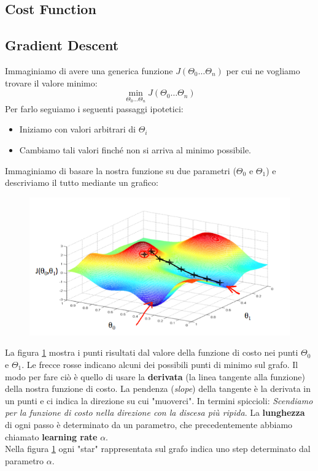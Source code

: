 \subsection{Cost Function}

\subsection{Gradient Descent}
Immaginiamo di avere una generica funzione $J(\Theta_0 \dots \Theta_n)$ per cui ne vogliamo trovare il valore minimo:
\[\min_{\Theta_0 \dots \Theta_n} J(\Theta_0 \dots \Theta_n)\]
Per farlo seguiamo i seguenti passaggi ipotetici:
\begin{itemize}
    \item Iniziamo con valori arbitrari di $\Theta_i$
    \item Cambiamo tali valori finché non si arriva al minimo possibile.
\end{itemize}
Immaginiamo di basare la nostra funzione su due parametri ($\Theta_0$ e $\Theta_1$) e descriviamo il tutto mediante un grafico:
\begin{figure}[h!]
    \centering
    \includegraphics[width=1\textwidth]{img/bn9SyaDIEeav5QpTGIv-Pg_0d06dca3d225f3de8b5a4a7e92254153_Screenshot-2016-11-01-23.48.26.png}
    \caption{}\label{GradientDescent1}
\end{figure}
La figura \ref{GradientDescent1} mostra i punti risultati dal valore della funzione di costo nei punti $\Theta_0$ e $\Theta_1$. Le frecce rosse indicano alcuni dei possibili punti di minimo sul grafo. Il modo per fare ciò è quello di usare la \textbf{derivata} (la linea tangente alla funzione) della nostra funzione di costo. La pendenza (\textit{slope}) della tangente è la derivata in un punti e ci indica la direzione su cui "muoverci". In termini spiccioli: \textit{Scendiamo per la funzione di costo nella direzione con la discesa più ripida}. La \textbf{lunghezza} di ogni passo è determinato da un parametro, che precedentemente abbiamo chiamato \textbf{learning rate} $\alpha$. \\ Nella figura \ref{GradientDescent1} ogni "star" rappresentata sul grafo indica uno step determinato dal parametro $\alpha$. 
